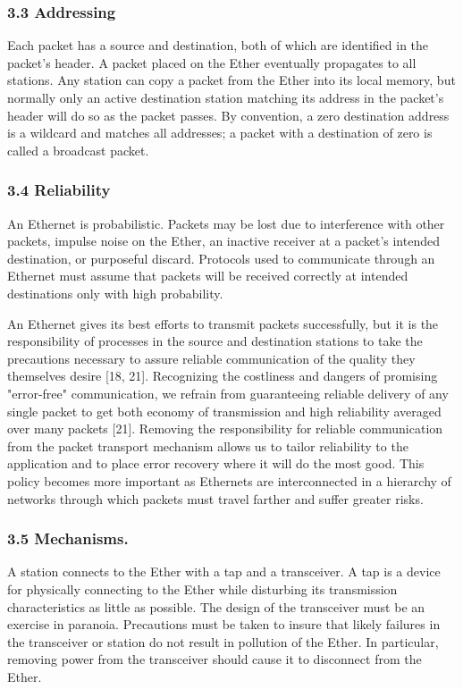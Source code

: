 \subsubsection{3.3 Addressing}
Each packet has a source and destination, both of which are identified in the packet's header. A packet placed on the Ether eventually propagates to all stations. Any station can copy a packet from the Ether into its local memory, but normally only an active destination station matching its address in the packet's header will do so as the packet passes. By convention, a zero destination address is a wildcard and matches all addresses; a packet with a destination of zero is called a broadcast packet.


\subsubsection{3.4 Reliability}
An Ethernet is probabilistic. Packets may be lost due to interference with other packets, impulse noise on the  Ether, an inactive receiver at a packet's intended destination, or purposeful discard. Protocols used to communicate through an Ethernet must assume that packets will be received correctly at intended destinations only with high probability.

An Ethernet gives its best efforts to transmit packets successfully, but it is the responsibility of processes in the source and destination stations to take the precautions necessary to assure reliable communication of the quality they themselves desire [18, 21]. Recognizing the costliness and dangers of promising "error-free" communication, we refrain from guaranteeing reliable delivery of any single packet to get both economy of transmission and high reliability averaged over many packets [21]. Removing the responsibility for reliable communication from the packet transport mechanism allows us to tailor reliability to the application and to place error recovery where it will do the most good. This policy becomes more important as Ethernets are interconnected in a hierarchy of networks through which packets must travel farther and suffer greater risks.

\subsubsection{3.5 Mechanisms.}
A station connects to the Ether with a tap and a transceiver. A tap is a device for physically connecting to the Ether while disturbing its transmission characteristics as little as possible. The design of the transceiver must be an exercise in paranoia. Precautions must be taken to insure that likely failures in the transceiver or station do not result in pollution of the Ether. In particular, removing power from the transceiver should cause it to disconnect from the Ether.


